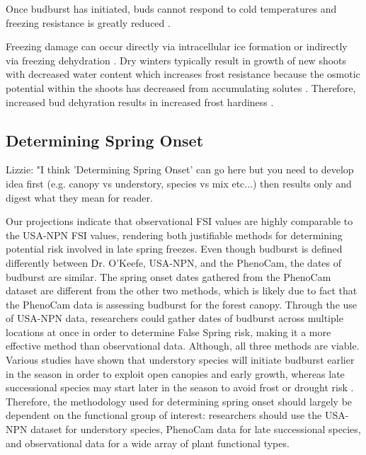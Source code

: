 \documentclass{article}\usepackage[]{graphicx}\usepackage[]{color}
\begin{document}
Once budburst has initiated, buds cannot respond to cold temperatures and freezing resistance is greatly reduced \citep{Vitasse2014, Lenz2013, Taschler2004}.

Freezing damage can occur directly via intracellular ice formation or indirectly via freezing dehydration \citep{Hofmann2015, Beck2004, Pearce2001}. Dry winters typically result in growth of new shoots with decreased water content which increases frost resistance because the osmotic potential within the shoots has decreased from accumulating solutes \citep{Hofmann2015, Morin2007}. Therefore, increased bud dehyration results in increased frost hardiness \citep{Hofmann2015, Kathke2011, Poirier2010, Nielsen2009, Beck2007}.

\subsection*{Determining Spring Onset}
Lizzie: "I think 'Determining Spring Onset' can go here but you need to develop idea first (e.g. canopy vs understory, species vs mix etc...) then results only and digest what they mean for reader.

Our projections indicate that observational FSI values are highly comparable to the USA-NPN FSI values, rendering both justifiable methods for determining potential risk involved in late spring freezes. Even though budburst is defined differently between Dr. O'Keefe, USA-NPN, and the PhenoCam, the dates of budburst are similar. The spring onset dates gathered from the PhenoCam dataset are different from the other two methods, which is likely due to fact that the PhenoCam data is assessing budburst for the forest canopy. Through the use of USA-NPN data, researchers could gather dates of budburst across multiple locations at once in order to determine False Spring risk, making it a more effective method than observational data. Although, all three methods are viable. Various studies have shown that understory species will initiate budburst earlier in the season in order to exploit open canopies and early growth, whereas late successional species may start later in the season to avoid frost or drought risk \citep{Xin2016, Richardson2009}. Therefore, the methodology used for determining spring onset should largely be dependent on the functional group of interest: researchers should use the USA-NPN dataset for understory species, PhenoCam data for late successional species, and observational data for a wide array of plant functional types. 
\end{document}
